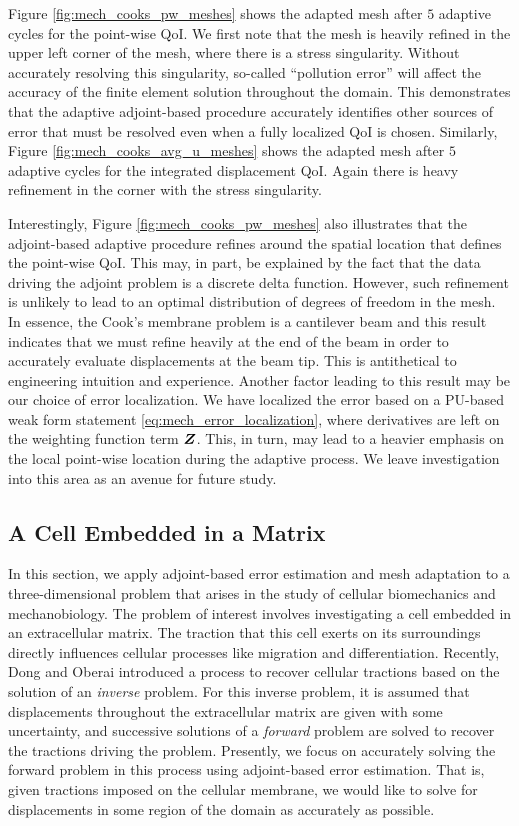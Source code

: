 Figure \ref{fig:mech_cooks_pw_meshes} shows the adapted mesh after $5$
adaptive cycles for the point-wise QoI. We first note that the mesh is
heavily refined in the upper left corner of the mesh, where there is a stress
singularity. Without accurately resolving this singularity, so-called
``pollution error'' \cite{babuvska1994pollution}
will affect the accuracy of the finite element solution
throughout the domain. This demonstrates that the adaptive adjoint-based
procedure accurately identifies other sources of error that must be resolved
even when a fully localized QoI is chosen. Similarly, Figure
\ref{fig:mech_cooks_avg_u_meshes} shows the adapted mesh after $5$
adaptive cycles for the integrated displacement QoI. Again there is heavy
refinement in the corner with the stress singularity.

Interestingly, Figure \ref{fig:mech_cooks_pw_meshes} also illustrates that
the adjoint-based adaptive procedure refines around the spatial location
that defines the point-wise QoI. This may, in part, be explained by the fact
that the data driving the adjoint problem is a discrete delta function.
However, such refinement is unlikely to lead to an optimal distribution of
degrees of freedom in the mesh. In essence, the Cook's membrane problem
is a cantilever beam and this result indicates that we must refine
heavily at the end of the beam in order to accurately evaluate displacements
at the beam tip. This is antithetical to engineering intuition and
experience. Another factor leading to this result may be our choice of
error localization. We have localized the error based on a PU-based weak
form statement \eqref{eq:mech_error_localization}, where derivatives are left
on the weighting function term $\boldsymbol{Z}$. This, in turn, may lead to a
heavier emphasis on the local point-wise location during the adaptive
process. We leave investigation into this area as an avenue for future
study.

\subsection{A Cell Embedded in a Matrix}

In this section, we apply adjoint-based error estimation and mesh adaptation
to a three-dimensional problem that arises in the study of cellular
biomechanics and mechanobiology. The problem of interest involves
investigating a cell embedded in an extracellular matrix. The traction that
this cell exerts on its surroundings directly influences cellular processes
like migration and differentiation. Recently, Dong and Oberai
\cite{dong2017recovery} introduced a process to recover cellular tractions
based on the solution of an \emph{inverse} problem. For this inverse problem,
it is assumed that displacements throughout the extracellular matrix are given
with some uncertainty, and successive solutions of a \emph{forward} problem are
solved to recover the tractions driving the problem. Presently, we focus on
accurately solving the forward problem in this process using adjoint-based
error estimation. That is, given tractions imposed on the cellular membrane,
we would like to solve for displacements in some region of the domain as
accurately as possible. 


